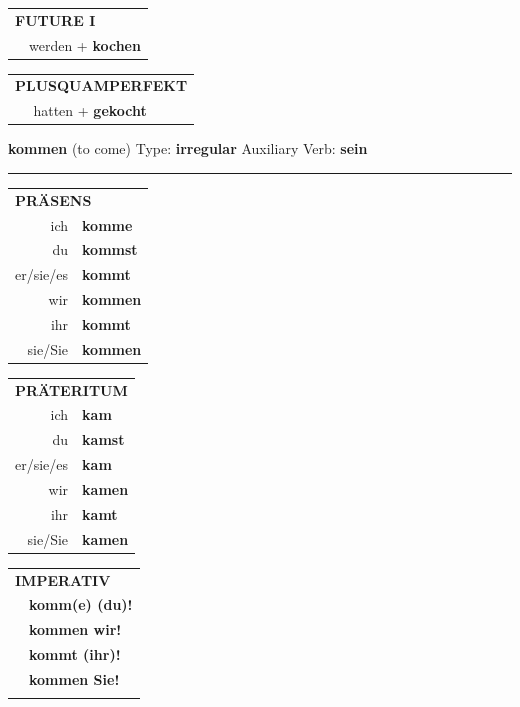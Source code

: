 \documentclass[10pt,a4paper]{revtex4-2}
\begin{document}
\begin{verbbox-acc}
\begin{tabular}{rl}
    \multicolumn{2}{l}{\textbf{FUTURE I} }\\
   & werden + \textbf{kochen}\\
 
  \end{tabular}
\hfill
   \begin{tabular}{rl}
      \multicolumn{2}{l}{\textbf{PLUSQUAMPERFEKT}}\\
    & hatten + \textbf{gekocht}\\
  \end{tabular}
  
  \vspace{-5pt}


\end{verbbox-acc}
\begin{verbbox}
    {\Large \bf kommen} (to come) \hfill Type: \textbf{irregular} \hfill Auxiliary Verb: \textbf{sein} 
    
     \vspace{5pt}

    \hrule
    
    \vspace{5pt}

  \begin{tabular}{rl}
     \multicolumn{2}{l}{\textbf{PRÄSENS} }\\
    ich & \textbf{komme}\\
    du & \textbf{kommst}\\
    er/sie/es & \textbf{kommt}\\
    wir & \textbf{kommen}\\
    ihr & \textbf{kommt}\\
    sie/Sie & \textbf{kommen}\\
  \end{tabular}
  \hfill
     \begin{tabular}{rl}
    \multicolumn{2}{l}{\textbf{PRÄTERITUM} }\\
    ich & \textbf{kam}\\
    du & \textbf{kamst}\\
    er/sie/es & \textbf{kam}\\
    wir & \textbf{kamen}\\
    ihr & \textbf{kamt}\\
    sie/Sie & \textbf{kamen}\\
  \end{tabular}
  \hfill
  \begin{tabular}{rl}
     \multicolumn{2}{l}{\textbf{IMPERATIV} }\\
   & \textbf{komm(e) (du)!}\\
   & \textbf{kommen wir!}\\
   & \textbf{kommt (ihr)!}\\
   & \textbf{kommen Sie!}\\
   & \vspace{10pt}
  \end{tabular}


\end{verbbox}
\end{document}
